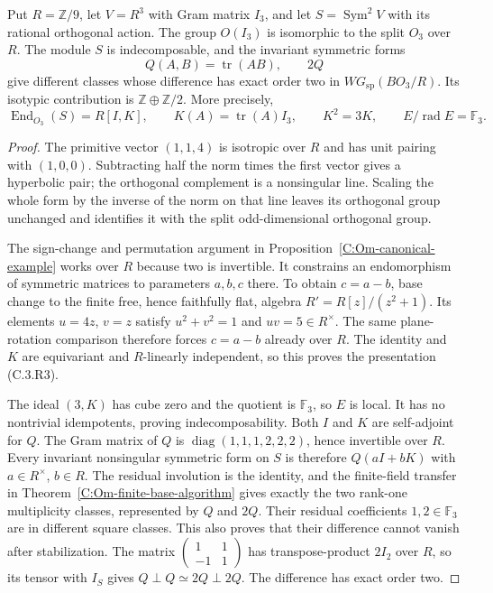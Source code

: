 \begin{proposition}
\label{C:Om-finite-base-form-example}
Put $R=\mathbb Z/9$, let $V=R^3$ with Gram matrix $I_3$, and
let $S=\operatorname{Sym}^2V$ with its rational orthogonal action.
The group $O(I_3)$ is isomorphic to the split $O_3$ over $R$.
The module $S$ is indecomposable, and the
invariant symmetric forms
\[
                Q(A,B)=\operatorname{tr}(AB),\qquad 2Q
\]
give different classes whose difference has exact order two
in $WG_{\mathrm{sp}}(BO_3/R)$. Its isotypic contribution is
$\mathbb Z\oplus\mathbb Z/2$. More precisely,
\[
 \operatorname{End}_{O_3}(S)=R[I,K],\qquad
 K(A)=\operatorname{tr}(A)I_3,\qquad K^2=3K,\qquad
 E/\operatorname{rad}E=\mathbb F_3 .                     \tag{C.3.R3}
\]
\end{proposition}
\begin{proof}
The primitive vector $(1,1,4)$ is isotropic over $R$ and has
unit pairing with $(1,0,0)$. Subtracting half the norm times
the first vector gives a hyperbolic pair; the orthogonal
complement is a nonsingular line. Scaling the whole form by
the inverse of the norm on that line leaves its orthogonal
group unchanged and identifies it with the split odd-dimensional
orthogonal group.

The sign-change and permutation argument in
Proposition~\ref{C:Om-canonical-example} works over $R$ because
two is invertible. It constrains an endomorphism of symmetric
matrices to parameters $a,b,c$ there. To obtain $c=a-b$,
base change to the finite free, hence faithfully flat, algebra
$R'=R[z]/(z^2+1)$. Its elements $u=4z$, $v=z$ satisfy
$u^2+v^2=1$ and $uv=5\in R^\times$. The same plane-rotation
comparison therefore forces $c=a-b$ already over $R$.
The identity and $K$ are equivariant and $R$-linearly independent,
so this proves the presentation (C.3.R3).

The ideal $(3,K)$ has cube zero and the quotient is $\mathbb F_3$,
so $E$ is local. It has no nontrivial idempotents, proving
indecomposability. Both $I$ and $K$ are self-adjoint for $Q$.
The Gram matrix of $Q$ is
$\operatorname{diag}(1,1,1,2,2,2)$, hence invertible over $R$.
Every invariant nonsingular symmetric form on $S$ is therefore
$Q(aI+bK)$ with $a\in R^\times$, $b\in R$.
The residual involution is the identity, and the finite-field
transfer in Theorem~\ref{C:Om-finite-base-algorithm} gives
exactly the two rank-one multiplicity classes, represented by
$Q$ and $2Q$. Their residual coefficients $1,2\in\mathbb F_3$
are in different square classes. This also proves that their
difference cannot vanish after stabilization. The matrix
$\left(\begin{smallmatrix}1&1\\-1&1\end{smallmatrix}\right)$
has transpose-product $2I_2$ over $R$, so its tensor with $I_S$
gives $Q\perp Q\simeq2Q\perp2Q$. The difference has exact
order two.


\end{proof}
